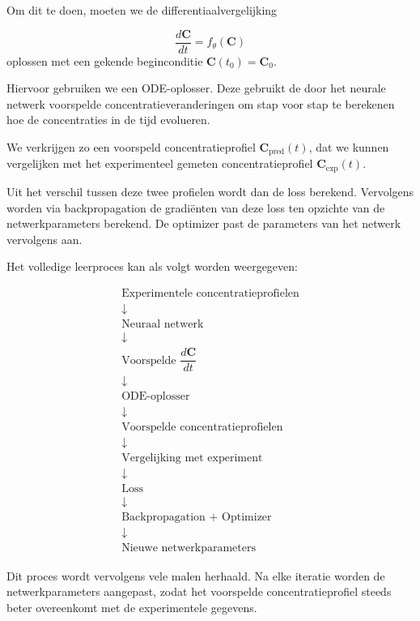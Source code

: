 \documentclass{ximera}
\begin{document}
Om dit te doen, moeten we de differentiaalvergelijking

\[
\frac{d\mathbf{C}}{dt} = f_\theta(\mathbf{C})
\]
oplossen met een gekende beginconditie
$\mathbf{C}(t_0) = \mathbf{C}_0$.

Hiervoor gebruiken we een ODE-oplosser. Deze gebruikt de door het neurale netwerk voorspelde concentratieveranderingen om stap voor stap te berekenen hoe de concentraties in de tijd evolueren.

We verkrijgen zo een voorspeld concentratieprofiel $\mathbf{C}_{\mathrm{pred}}(t)$, dat we kunnen vergelijken met het experimenteel gemeten concentratieprofiel
$\mathbf{C}_{\mathrm{exp}}(t).$

Uit het verschil tussen deze twee profielen wordt dan de loss berekend. Vervolgens worden via backpropagation de gradiënten van deze loss ten opzichte van de netwerkparameters berekend. De optimizer past de parameters van het netwerk vervolgens aan.

\begin{procedure} \text{ }

Het volledige leerproces kan als volgt worden weergegeven:

\[
\begin{array}{c}
\text{Experimentele concentratieprofielen}
\\
\downarrow
\\
\text{Neuraal netwerk}
\\
\downarrow
\\
\text{Voorspelde } \dfrac{d\mathbf{C}}{dt}
\\
\downarrow
\\
\text{ODE-oplosser}
\\
\downarrow
\\
\text{Voorspelde concentratieprofielen}
\\
\downarrow
\\
\text{Vergelijking met experiment}
\\
\downarrow
\\
\text{Loss}
\\
\downarrow
\\
\text{Backpropagation + Optimizer}
\\
\downarrow
\\
\text{Nieuwe netwerkparameters}
\end{array}
\]

Dit proces wordt vervolgens vele malen herhaald. Na elke iteratie worden de netwerkparameters aangepast, zodat het voorspelde concentratieprofiel steeds beter overeenkomt met de experimentele gegevens.
\end{procedure}
\end{document}
